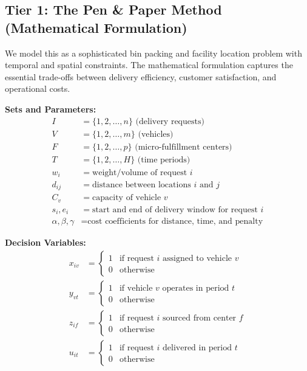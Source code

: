\documentclass{article}
\begin{document}
\subsection{Tier 1: The Pen \& Paper Method (Mathematical Formulation)}

We model this as a sophisticated bin packing and facility location problem with temporal and spatial constraints. The mathematical formulation captures the essential trade-offs between delivery efficiency, customer satisfaction, and operational costs.

\textbf{Sets and Parameters:}
\begin{align}
I &= \{1, 2, \ldots, n\} \text{ (delivery requests)} \\
V &= \{1, 2, \ldots, m\} \text{ (vehicles)} \\
F &= \{1, 2, \ldots, p\} \text{ (micro-fulfillment centers)} \\
T &= \{1, 2, \ldots, H\} \text{ (time periods)} \\
w_i &= \text{weight/volume of request } i \\
d_{ij} &= \text{distance between locations } i \text{ and } j \\
C_v &= \text{capacity of vehicle } v \\
s_i, e_i &= \text{start and end of delivery window for request } i \\
\alpha, \beta, \gamma &= \text{cost coefficients for distance, time, and penalty}
\end{align}

\textbf{Decision Variables:}
\begin{align}
x_{iv} &= \begin{cases} 1 & \text{if request } i \text{ assigned to vehicle } v \\ 0 & \text{otherwise} \end{cases} \\
y_{vt} &= \begin{cases} 1 & \text{if vehicle } v \text{ operates in period } t \\ 0 & \text{otherwise} \end{cases} \\
z_{if} &= \begin{cases} 1 & \text{if request } i \text{ sourced from center } f \\ 0 & \text{otherwise} \end{cases} \\
u_{it} &= \begin{cases} 1 & \text{if request } i \text{ delivered in period } t \\ 0 & \text{otherwise} \end{cases}
\end{align}
\end{document}
